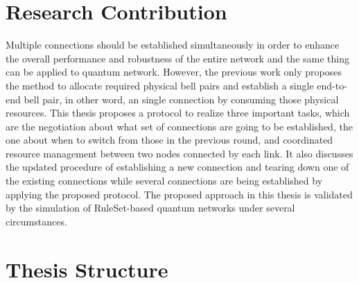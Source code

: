 \section{Research Contribution}
\label{introduction:research-contribution}

Multiple connections should be established simultaneously in order to enhance the overall performance and robustness of the entire network and the same thing can be applied to quantum network. 
However, the previous work only proposes the method to allocate required physical bell pairs and establish a single end-to-end bell pair, in other word, an single connection by consuming those physical resources.
This thesis proposes a protocol to realize three important tasks, which are the negotiation about what set of connections are going to be established, the one about when to switch from those in the previous round, and coordinated resource management between two nodes connected by each link.
It also discusses the updated procedure of establishing a new connection and tearing down one of the existing connections while several connections are being established by applying the proposed protocol.
The proposed approach in this thesis is validated by the simulation of RuleSet-based quantum networks under several circumstances.

\section{Thesis Structure}
\label{introduction:thesis-structure} 



